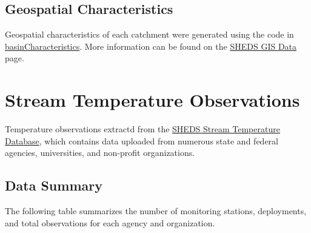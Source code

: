 \documentclass[]{book}
\begin{document}
\hypertarget{geospatial-characteristics}{%
\subsection{Geospatial Characteristics}\label{geospatial-characteristics}}

Geospatial characteristics of each catchment were generated using the code in \href{https://github.com/Conte-Ecology/shedsGisData/tree/master/basinCharacteristics}{basinCharacteristics}. More information can be found on the \href{https://conte-ecology.github.io/shedsGisData/}{SHEDS GIS Data} page.

\hypertarget{stream-temperature-observations}{%
\section{Stream Temperature Observations}\label{stream-temperature-observations}}

Temperature observations extractd from the \href{http://db.ecosheds.org}{SHEDS Stream Temperature Database}, which contains data uploaded from numerous state and federal agencies, universities, and non-profit organizations.

\hypertarget{data-summary}{%
\subsection{Data Summary}\label{data-summary}}

The following table summarizes the number of monitoring stations, deployments, and total observations for each agency and organization.
\end{document}
